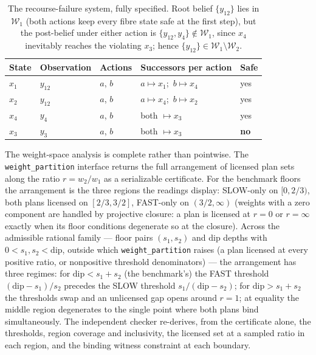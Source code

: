 \documentclass[11pt]{article}
\begin{document}
\begin{table}[t]
\centering\small
\begin{tabular}{@{}lllll@{}}
\toprule
State & Observation & Actions & Successors per action & Safe \\
\midrule
$x_1$ & $y_{12}$ & $a$, $b$ & $a \mapsto x_1$;\ $b \mapsto x_4$ & yes \\
$x_2$ & $y_{12}$ & $a$, $b$ & $a \mapsto x_4$;\ $b \mapsto x_2$ & yes \\
$x_4$ & $y_4$ & $a$, $b$ & both $\mapsto x_3$ & yes \\
$x_3$ & $y_3$ & $a$, $b$ & both $\mapsto x_3$ & \textbf{no} \\
\bottomrule
\end{tabular}
\caption{The recourse-failure system, fully specified. Root belief
$\{y_{12}\}$ lies in $\mathcal{W}_1$ (both actions keep every fibre
state safe at the first step), but the post-belief under either action is
$\{y_{12}, y_4\} \notin \mathcal{W}_1$, since $x_4$ inevitably reaches
the violating $x_3$; hence
$\{y_{12}\} \in \mathcal{W}_1 \setminus \mathcal{W}_2$.}
\label{tab:recourse}
\end{table}

The weight-space analysis is complete rather than pointwise. The
\texttt{weight\_partition} interface returns the full arrangement of
licensed plan sets along the ratio $r = w_2/w_1$ as a serializable
certificate. For the benchmark floors the arrangement is the three regions
the readings display: SLOW-only on $[0, 2/3)$, both plans licensed on
$[2/3, 3/2]$, FAST-only on $(3/2, \infty)$ (weights with a zero
component are handled by projective closure: a plan is licensed at
$r = 0$ or $r = \infty$ exactly when its floor conditions degenerate so
at the closure). Across the admissible rational family --- floor pairs
$(s_1, s_2)$ and dip depths with $0 < s_1, s_2 < \mathrm{dip}$, outside
which \texttt{weight\_partition} raises (a plan licensed at every
positive ratio, or nonpositive threshold denominators) --- the arrangement
has three regimes:
for $\mathrm{dip} < s_1 + s_2$ (the benchmark's) the FAST threshold
$(\mathrm{dip} - s_1)/s_2$ precedes the SLOW threshold
$s_1/(\mathrm{dip} - s_2)$; for $\mathrm{dip} > s_1 + s_2$ the thresholds
swap and an unlicensed gap opens around $r = 1$; at equality the middle
region degenerates to the single point where both plans bind
simultaneously. The independent checker re-derives, from the certificate
alone, the thresholds, region coverage and inclusivity, the licensed set at
a sampled ratio in each region, and the binding witness constraint at each
boundary.
\end{document}
